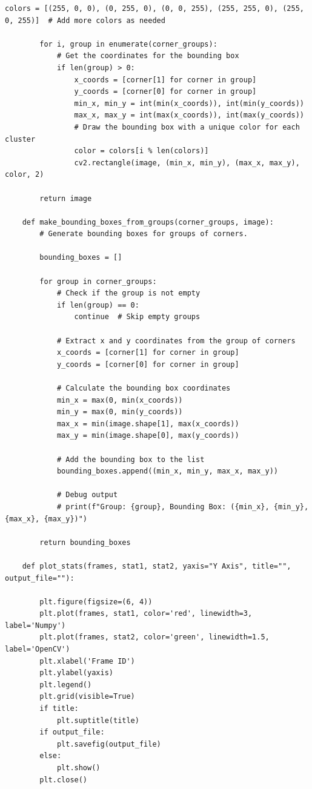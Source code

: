 \documentclass[11pt, conference, letterpaper]{IEEEtran}
\begin{document}
\begin{lstlisting}[style=python, caption={\texttt{plot\_utils.py}}, label={lst:putils}]
        colors = [(255, 0, 0), (0, 255, 0), (0, 0, 255), (255, 255, 0), (255, 0, 255)]  # Add more colors as needed
        
        for i, group in enumerate(corner_groups):
            # Get the coordinates for the bounding box
            if len(group) > 0:
                x_coords = [corner[1] for corner in group]
                y_coords = [corner[0] for corner in group]
                min_x, min_y = int(min(x_coords)), int(min(y_coords))
                max_x, max_y = int(max(x_coords)), int(max(y_coords))
                # Draw the bounding box with a unique color for each cluster
                color = colors[i % len(colors)]
                cv2.rectangle(image, (min_x, min_y), (max_x, max_y), color, 2)
    
        return image
    
    def make_bounding_boxes_from_groups(corner_groups, image):
        # Generate bounding boxes for groups of corners.
        
        bounding_boxes = []
        
        for group in corner_groups:
            # Check if the group is not empty
            if len(group) == 0:
                continue  # Skip empty groups
    
            # Extract x and y coordinates from the group of corners
            x_coords = [corner[1] for corner in group]
            y_coords = [corner[0] for corner in group]
            
            # Calculate the bounding box coordinates
            min_x = max(0, min(x_coords))
            min_y = max(0, min(y_coords))
            max_x = min(image.shape[1], max(x_coords))
            max_y = min(image.shape[0], max(y_coords))
            
            # Add the bounding box to the list
            bounding_boxes.append((min_x, min_y, max_x, max_y))
    
            # Debug output
            # print(f"Group: {group}, Bounding Box: ({min_x}, {min_y}, {max_x}, {max_y})")
    
        return bounding_boxes
    
    def plot_stats(frames, stat1, stat2, yaxis="Y Axis", title="", output_file=""):
        
        plt.figure(figsize=(6, 4))
        plt.plot(frames, stat1, color='red', linewidth=3, label='Numpy')
        plt.plot(frames, stat2, color='green', linewidth=1.5, label='OpenCV')
        plt.xlabel('Frame ID')
        plt.ylabel(yaxis)
        plt.legend()
        plt.grid(visible=True)
        if title:
            plt.suptitle(title)
        if output_file:
            plt.savefig(output_file)
        else:
            plt.show()
        plt.close()
    

\end{lstlisting}
\end{document}
